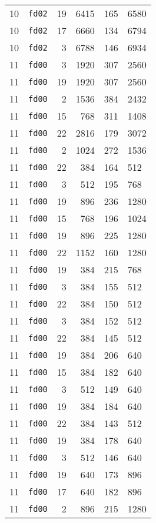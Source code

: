 \documentclass{article}
\begin{document}
\begin{table}[h!]
\begin{tabular}{llrrrl}
    10 & \texttt{fd02} & 19 & 6415 & 165 & 6580 \\
    10 & \texttt{fd02} & 17 & 6660 & 134 & 6794 \\
    10 & \texttt{fd02} & 3 & 6788 & 146 & 6934 \\
    11 & \texttt{fd00} & 3 & 1920 & 307 & 2560 \\
    11 & \texttt{fd00} & 19 & 1920 & 307 & 2560 \\
    11 & \texttt{fd00} & 2 & 1536 & 384 & 2432 \\
    11 & \texttt{fd00} & 15 & 768 & 311 & 1408 \\
    11 & \texttt{fd00} & 22 & 2816 & 179 & 3072 \\
    11 & \texttt{fd00} & 2 & 1024 & 272 & 1536 \\
    11 & \texttt{fd00} & 22 & 384 & 164 & 512 \\
    11 & \texttt{fd00} & 3 & 512 & 195 & 768 \\
    11 & \texttt{fd00} & 19 & 896 & 236 & 1280 \\
    11 & \texttt{fd00} & 15 & 768 & 196 & 1024 \\
    11 & \texttt{fd00} & 19 & 896 & 225 & 1280 \\
    11 & \texttt{fd00} & 22 & 1152 & 160 & 1280 \\
    11 & \texttt{fd00} & 19 & 384 & 215 & 768 \\
    11 & \texttt{fd00} & 3 & 384 & 155 & 512 \\
    11 & \texttt{fd00} & 22 & 384 & 150 & 512 \\
    11 & \texttt{fd00} & 3 & 384 & 152 & 512 \\
    11 & \texttt{fd00} & 22 & 384 & 145 & 512 \\
    11 & \texttt{fd00} & 19 & 384 & 206 & 640 \\
    11 & \texttt{fd00} & 15 & 384 & 182 & 640 \\
    11 & \texttt{fd00} & 3 & 512 & 149 & 640 \\
    11 & \texttt{fd00} & 19 & 384 & 184 & 640 \\
    11 & \texttt{fd00} & 22 & 384 & 143 & 512 \\
    11 & \texttt{fd00} & 19 & 384 & 178 & 640 \\
    11 & \texttt{fd00} & 3 & 512 & 146 & 640 \\
    11 & \texttt{fd00} & 19 & 640 & 173 & 896 \\
    11 & \texttt{fd00} & 17 & 640 & 182 & 896 \\
    11 & \texttt{fd00} & 2 & 896 & 215 & 1280 \\

\end{tabular}
\end{table}
\end{document}
